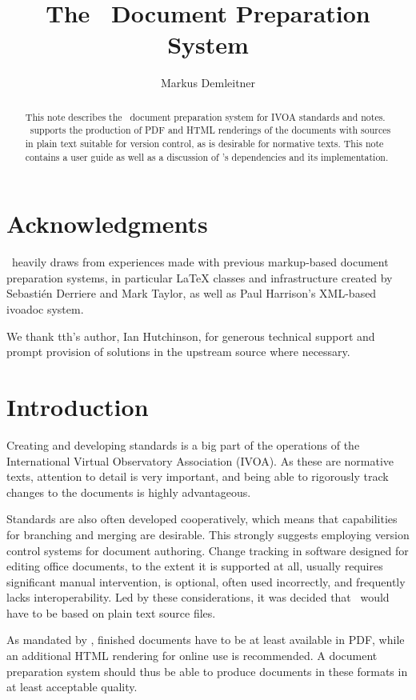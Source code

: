 \documentclass[11pt,a4paper]{ivoa}
\title{The \ivoatex\ Document Preparation System}
\author[http://www.ivoa.net/cgi-bin/twiki/bin/view/IVOA/MarkusDemleitner]{Markus Demleitner}
\begin{document}
\begin{abstract}
This note describes the \ivoatex\ document preparation system for IVOA
standards and notes.  \ivoatex\ supports the production of
PDF and HTML renderings of the documents with sources in
plain text suitable for version control, as is desirable for normative
texts.  This note contains a user guide as well as a discussion of 
\ivoatex's dependencies and its implementation.
\end{abstract}


\section*{Acknowledgments}

\ivoatex\ heavily draws from experiences made with previous markup-based
document preparation systems, in particular LaTeX classes and
infrastructure created by Sebasti\'en Derriere and Mark Taylor, as well
as Paul Harrison's XML-based ivoadoc system.

We thank tth's author, Ian Hutchinson, for generous technical support
and prompt provision of solutions in the upstream source where necessary.

\section{Introduction}

Creating and developing standards is a  big part of the operations of
the International Virtual Observatory Association (IVOA).
As these are normative texts, attention to detail is very important, and
being able to rigorously track changes to the documents is highly
advantageous.  

Standards are also often developed cooperatively, which means that
capabilities for branching and merging are desirable.  This strongly
suggests employing version control systems for document authoring.
Change tracking in software designed for editing office documents, to
the extent it is supported at all, usually requires significant
manual intervention, is optional, often used incorrectly, and frequently
lacks interoperability.  Led by these considerations, it was decided that
\ivoatex\ would have to be based on plain text source files.

As mandated by \citet{std:docSTD}, finished documents have to be at
least available in PDF, while an additional HTML rendering for online
use is recommended.  A document preparation system should thus be
able  to produce documents in these formats in at least acceptable
quality.
\end{document}
